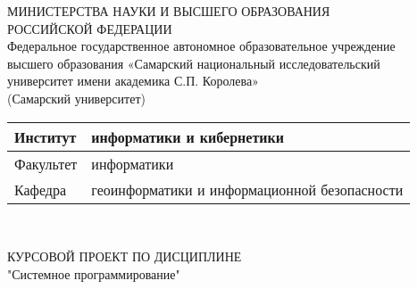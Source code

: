 \documentclass[oneside,final,14pt]{extreport}
\begin{document}
\def\figurename{Рисунок}
\renewcommand{\captionlabeldelim}{~--}
\begin{titlepage}
	
		\begin{center}
			{ 
				МИНИСТЕРСТВА НАУКИ И ВЫСШЕГО ОБРАЗОВАНИЯ \\ 
				РОССИЙСКОЙ ФЕДЕРАЦИИ\\
				Федеральное государственное автономное образовательное учреждение\\
				высшего образования «Самарский национальный исследовательский\\
				университет имени академика С.П. Королева»\\{(Самарский университет)}\\	
			}
		\end{center}
	
		\vfill
		
		\noindent
		\begin{minipage} {\textwidth}
			\begin{tabular}{
					|p{}
					|p{}|}
				\hline 
				Институт & информатики и кибернетики \\ \hline
				Факультет & информатики  \\ \hline
				Кафедра & геоинформатики и информационной безопасности \\ 
				\hline
			\end{tabular}
		\end{minipage}\\
	
		\vfill
		
		\begin{center}
			{
				КУРСОВОЙ ПРОЕКТ ПО ДИСЦИПЛИНЕ\\
				"Системное программирование"\\
			}
		\end{center}
	

\end{titlepage}
\end{document}
